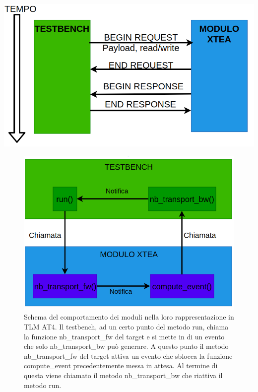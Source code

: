 \documentclass[]{IEEEtran}
\begin{document}
\begin{center}
	\includegraphics[width=\columnwidth]{Images/scheme3.png}
	\label{scheme3}
\end{center}
\begin{figure}[ht]
	\centering
	\includegraphics[width=\columnwidth]{Images/scheme4.png}
	\caption{Schema del comportamento dei moduli nella loro rappresentazione in TLM AT4. Il testbench, ad un certo punto del metodo run, chiama la funzione nb\_transport\_fw del target e si mette in di un evento che solo nb\_transport\_bw può generare. A questo punto il metodo nb\_transport\_fw del target attiva un evento che sblocca la funzione compute\_event precedentemente messa in attesa. Al termine di questa viene chiamato il metodo nb\_transport\_bw che riattiva il metodo run.}
	\label{scheme4}
\end{figure}
\end{document}
